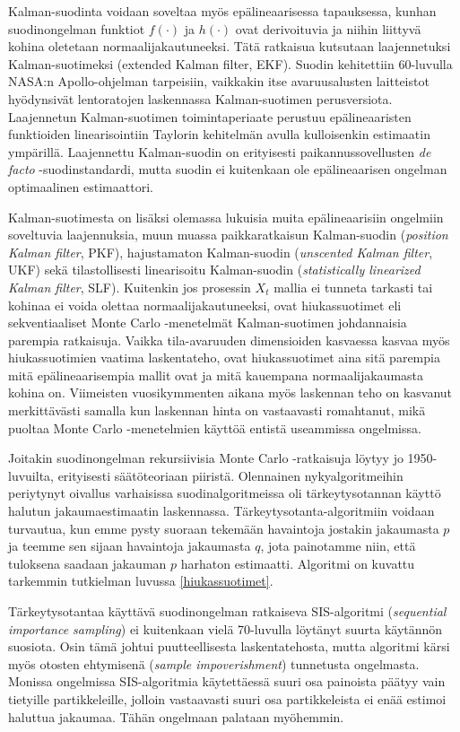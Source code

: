 \documentclass[
  12pt,
  a4paper, twoside]{book}
\begin{document}
Kalman-suodinta voidaan soveltaa myös epälineaarisessa tapauksessa, kunhan suodinongelman funktiot \(f(\cdot)\) ja \(h(\cdot)\) ovat derivoituvia ja niihin liittyvä kohina oletetaan normaalijakautuneeksi. Tätä ratkaisua kutsutaan laajennetuksi Kalman-suotimeksi (extended Kalman filter, EKF). Suodin kehitettiin 60-luvulla NASA:n Apollo-ohjelman tarpeisiin, vaikkakin itse avaruusalusten laitteistot hyödynsivät lentoratojen laskennassa Kalman-suotimen perusversiota. Laajennetun Kalman-suotimen toimintaperiaate perustuu epälineaaristen funktioiden linearisointiin Taylorin kehitelmän avulla kulloisenkin estimaatin ympärillä. Laajennettu Kalman-suodin on erityisesti paikannussovellusten \textit{de facto} -suodinstandardi, mutta suodin ei kuitenkaan ole epälineaarisen ongelman optimaalinen estimaattori.

Kalman-suotimesta on lisäksi olemassa lukuisia muita epälineaarisiin ongelmiin soveltuvia laajennuksia, muun muassa paikkaratkaisun Kalman-suodin (\emph{position Kalman filter}, PKF), hajustamaton Kalman-suodin (\emph{unscented Kalman filter}, UKF) sekä tilastollisesti linearisoitu Kalman-suodin (\emph{statistically linearized Kalman filter}, SLF). Kuitenkin jos prosessin \(X_t\) mallia ei tunneta tarkasti tai kohinaa ei voida olettaa normaalijakautuneeksi, ovat hiukassuotimet eli sekventiaaliset Monte Carlo -menetelmät Kalman-suotimen johdannaisia parempia ratkaisuja. Vaikka tila-avaruuden dimensioiden kasvaessa kasvaa myös hiukassuotimien vaatima laskentateho, ovat hiukassuotimet aina sitä parempia mitä epälineaarisempia mallit ovat ja mitä kauempana normaalijakaumasta kohina on. Viimeisten vuosikymmenten aikana myös laskennan teho on kasvanut merkittävästi samalla kun laskennan hinta on vastaavasti romahtanut, mikä puoltaa Monte Carlo -menetelmien käyttöä entistä useammissa ongelmissa.

Joitakin suodinongelman rekursiivisia Monte Carlo -ratkaisuja löytyy jo 1950-luvuilta, erityisesti säätöteoriaan piiristä. Olennainen nykyalgoritmeihin periytynyt oivallus varhaisissa suodinalgoritmeissa oli tärkeytysotannan käyttö halutun jakaumaestimaatin laskennassa. Tärkeytysotanta-algoritmiin voidaan turvautua, kun emme pysty suoraan tekemään havaintoja jostakin jakaumasta \(p\) ja teemme sen sijaan havaintoja jakaumasta \(q\), jota painotamme niin, että tuloksena saadaan jakauman \(p\) harhaton estimaatti. Algoritmi on kuvattu tarkemmin tutkielman luvussa \ref{hiukassuotimet}.

Tärkeytysotantaa käyttävä suodinongelman ratkaiseva SIS-algoritmi (\emph{sequential importance sampling}) ei kuitenkaan vielä 70-luvulla löytänyt suurta käytännön suosiota. Osin tämä johtui puutteellisesta laskentatehosta, mutta algoritmi kärsi myös otosten ehtymisenä (\emph{sample impoverishment}) tunnetusta ongelmasta. Monissa ongelmissa SIS-algoritmia käytettäessä suuri osa painoista päätyy vain tietyille partikkeleille, jolloin vastaavasti suuri osa partikkeleista ei enää estimoi haluttua jakaumaa. Tähän ongelmaan palataan myöhemmin.
\end{document}
